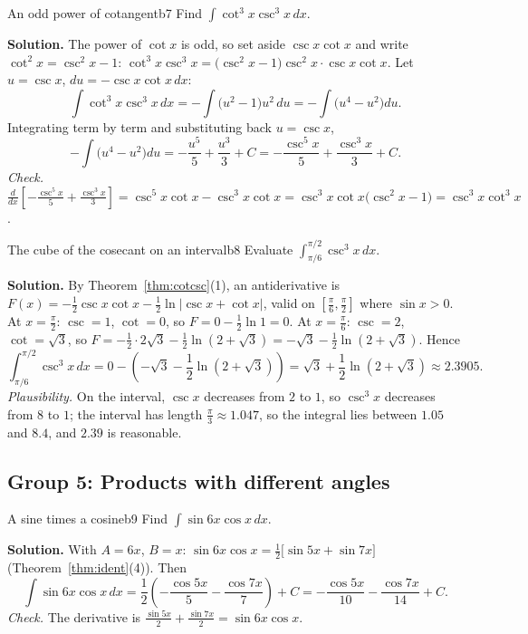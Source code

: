 \documentclass[11pt]{article}
\begin{document}
\begin{exmp}{An odd power of cotangent}{b7}
Find $\int\cot^3x\csc^3x\,dx$.

\textbf{Solution.} The power of $\cot x$ is odd, so set aside $\csc x\cot x$ and write $\cot^2x=\csc^2x-1$: $\cot^3x\csc^3x=\big(\csc^2x-1\big)\csc^2x\cdot\csc x\cot x$. Let $u=\csc x$, $du=-\csc x\cot x\,dx$:
\[\int\cot^3x\csc^3x\,dx=-\int\big(u^2-1\big)u^2\,du=-\int\big(u^4-u^2\big)du .\]
Integrating term by term and substituting back $u=\csc x$,
\[-\int\big(u^4-u^2\big)du=-\frac{u^5}5+\frac{u^3}3+C=-\frac{\csc^5x}5+\frac{\csc^3x}3+C .\]
\emph{Check.} $\frac{d}{dx}\left[-\frac{\csc^5x}5+\frac{\csc^3x}3\right]=\csc^5x\cot x-\csc^3x\cot x=\csc^3x\cot x\big(\csc^2x-1\big)=\csc^3x\cot^3x$.
\end{exmp}

\begin{exmp}{The cube of the cosecant on an interval}{b8}
Evaluate $\displaystyle\int_{\pi/6}^{\pi/2}\csc^3x\,dx$.

\textbf{Solution.} By Theorem~\ref{thm:cotcsc}(1), an antiderivative is $F(x)=-\frac12\csc x\cot x-\frac12\ln\lvert\csc x+\cot x\rvert$, valid on $\left[\frac\pi6,\frac\pi2\right]$ where $\sin x>0$. At $x=\frac\pi2$: $\csc=1$, $\cot=0$, so $F=0-\frac12\ln1=0$. At $x=\frac\pi6$: $\csc=2$, $\cot=\sqrt3$, so $F=-\frac12\cdot2\sqrt3-\frac12\ln\left(2+\sqrt3\right)=-\sqrt3-\frac12\ln\left(2+\sqrt3\right)$. Hence
\[\int_{\pi/6}^{\pi/2}\csc^3x\,dx=0-\left(-\sqrt3-\frac12\ln\left(2+\sqrt3\right)\right)=\sqrt3+\frac12\ln\left(2+\sqrt3\right)\approx2.3905 .\]
\emph{Plausibility.} On the interval, $\csc x$ decreases from $2$ to $1$, so $\csc^3x$ decreases from $8$ to $1$; the interval has length $\frac\pi3\approx1.047$, so the integral lies between $1.05$ and $8.4$, and $2.39$ is reasonable.
\end{exmp}

\subsection*{Group 5: Products with different angles}

\begin{exmp}{A sine times a cosine}{b9}
Find $\int\sin6x\cos x\,dx$.

\textbf{Solution.} With $A=6x$, $B=x$: $\sin6x\cos x=\frac12\big[\sin5x+\sin7x\big]$ (Theorem~\ref{thm:ident}(4)). Then
\[\int\sin6x\cos x\,dx=\frac12\left(-\frac{\cos5x}5-\frac{\cos7x}7\right)+C=-\frac{\cos5x}{10}-\frac{\cos7x}{14}+C .\]
\emph{Check.} The derivative is $\frac{\sin5x}2+\frac{\sin7x}2=\sin6x\cos x$.
\end{exmp}
\end{document}
